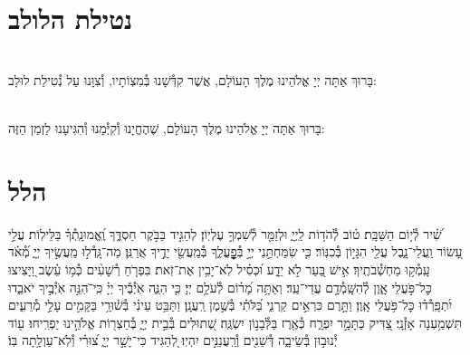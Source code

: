 \documentclass[twoside, openany, parskip=half, 11pt]{book}
\begin{document}
\shabbossimshalom

\tachanunim

\vfill

\\
\\

\clearpage

\section[נטילת הלולב]{ נטילת הלולב }

\\
בָּרוּךְ אַתָּה יְיָ אֱלֹהֵינוּ מֶלֶךְ הָעוֹלָם, אֲשֶׁר קִדְּ֯שָׁנוּ בְּ֯מִצְוֹתָיו, וְ֯צִוָּנוּ עַל נְ֯טִילַת לוּלָב:

\vspace{.5\baselineskip}

\\
בָּרוּךְ אַתָּה יְיָ אֱלֹהֵינוּ מֶלֶךְ הָעוֹלָם, שֶׁהֶחֱיָנוּ וְ֯קִיְּ֯מָנוּ וְ֯הִגִּיעָנוּ לַזְמַן הַזֶּה:

\section[הלל‎]{ הלל‎ }
\label{sometimes hallel}

\hallel{\chazzan}

\vfill

\label{shabboskaddishtiskabel}
\fullkaddish

\weekdayshir


שִׁ֝֗יר לְ֯י֥וֹם הַשַּׁבָּֽת׃
ט֗וֹב לְ֯הֹד֥וֹת לַֽיְיָ֑ וּלְזַמֵּ֖ר לְ֯שִׁמְךָ֣ עֶלְיֽוֹן׃
לְהַגִּ֣יד בַּבֹּ֣קֶר חַסְדֶּ֑ךָ וֶֽ֝אֱמוּנָֽתְ֯ךָ֗ בַּלֵּילֽוֹת׃
עֲלֵ֣י עָ֭שׂוֹר וַֽעֲלֵי־נָ֑בֶל עֲלֵ֖י הִגָּי֣וֹן בְּ֯כִנּֽוֹר׃
כִּ֤י שִׂמַּחְתַּ֣נִי יְיָ֣ בְּ֯פׇׇׇׇׇׇׇׇׇׇׇׇׇׇֽעֳלֶ֑ךָ בְּ֯מַֽעֲשֵׂ֖י יָדֶ֣יךָ אֲרַנֵּֽן׃
מַה־גָּֽדְ֯ל֣וּ מַֽעֲשֶׂ֣יךָ יְיָ֑ מְ֝֯אֹ֗ד עָֽמְ֯ק֥וּ מַחְשְׁ֯בֹתֶֽיךָ׃
אִ֣ישׁ בַּ֭עַר לֹ֣א יֵדָ֑ע וּ֝כְסִ֗יל לֹֽא־יָבִ֥ין אֶת־זֹֽאת׃
בִּפְרֹ֤חַ רְ֯שָׁעִ֨ים כְּ֯מ֥וֹ עֵ֗שֶׂב וַ֭יָּצִיצוּ כׇּל־פֹּ֣עֲלֵי אָ֑וֶן לְ֯הִשָּֽׁמְ֯דָ֥ם עֲדֵי־עַֽד׃
וְאַתָּ֥ה מָ֝ר֗וֹם לְ֯עֹלָ֥ם יְיָ׃
כִּ֤י הִנֵּ֢ה אֹֽיְ֯בֶ֡יךָ יְיָ֗ כִּֽי־ֹהִנֵּ֣ה אֹֽיְ֯בֶ֣יךָ יֹאבֵ֑דוּ יִ֝תְפָּֽרְ֯ד֗וּ כׇּל־פֹּ֥עֲלֵי אָֽוֶן׃
וַתָּ֣רֶם כִּרְאֵ֣ים קַרְנִ֑י בַּ֝לֹּתִ֗י בְּ֯שֶׁ֣מֶן רַֽעֲנָֽן׃
וַתַּבֵּ֥ט עֵינִ֗י בְּ֯שׁ֫וּרָ֥י בַּקָּמִ֣ים עָלַ֣י מְ֯רֵעִ֑ים תִּשְׁמַ֥עְנָה אָזְ֯נָֽי׃
צַ֭דִּיק כַּתָּמָ֣ר יִפְרָ֑ח כְּ֯אֶ֖רֶז בַּלְּ֯בָנ֣וֹן יִשְׂגֶּֽה׃
שְׁ֭תוּלִים בְּ֯בֵ֣ית יְיָ֑ בְּ֯חַצְר֖וֹת אֱלֹהֵ֣ינוּ יַפְרִֽיחוּ׃
ע֖וֹד יְ֯נוּב֣וּן בְּ֯שֵׂיבָ֑ה דְּ֯שֵׁנִ֖ים וְ֯רַֽעֲנַנִּ֣ים יִהְיֽוּ׃
לְ֭הַגִּיד כִּי־יָשָׁ֣ר יְיָ֑ צ֝וּרִ֗י וְ֯לֹֽא־עַוְלָ֥תָה בּֽוֹ׃
\mournerskaddish
\end{document}
